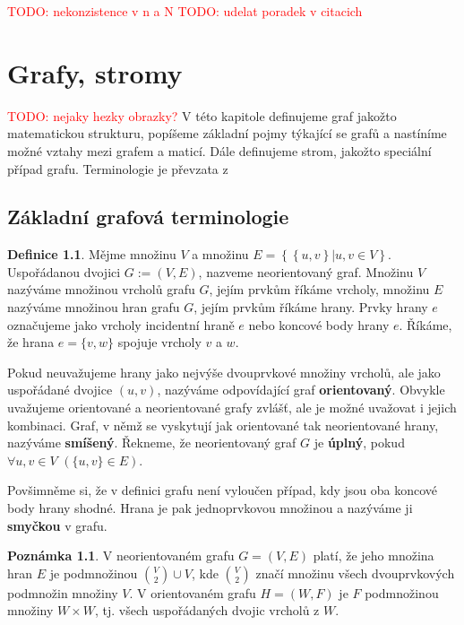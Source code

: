 \documentclass[11pt,american,czech,oneside]{book}
\theoremstyle{plain}
\theoremstyle{definition}
\newtheorem{definition}{Definice}
\newtheorem{remark}{Poznámka}
\newcommand{\TODO}[1]{\textcolor{red}{TODO: #1}}
\begin{document}
\TODO{nekonzistence v n a N}
\TODO{udelat poradek v citacich}


\chapter{Grafy, stromy} \TODO{nejaky hezky obrazky?} 
V této kapitole definujeme graf jakožto matematickou strukturu, popíšeme základní pojmy týkající se grafů a nastíníme možné vztahy mezi grafem a maticí. Dále definujeme strom, jakožto speciální případ grafu. Terminologie je převzata z \cite{koub:11}

\section{Základní grafová terminologie}

\begin{definition}
  Mějme množinu $V$ a množinu $E = \left\{ \left\{ u,v \right\} | u,v \in V \right\}$. Uspořádanou dvojici $G := (V,E)$, nazveme neorientovaný graf. Množinu $V$ nazýváme množinou vrcholů grafu $G$, jejím prvkům říkáme vrcholy, množinu $E$ nazýváme množinou hran grafu $G$, jejím prvkům říkáme hrany. Prvky hrany $e$ označujeme jako vrcholy incidentní hraně $e$ nebo koncové body hrany $e$. Říkáme, že hrana $e = \{v,w\}$ spojuje vrcholy $v$ a $w$.
\end{definition}

Pokud neuvažujeme hrany jako nejvýše dvouprvkové množiny vrcholů, ale  jako uspořádané dvojice $(u,v)$, nazýváme odpovídající graf \textbf{orientovaný}. Obvykle uvažujeme orientované a neorientované grafy zvlášť, ale je možné uvažovat i jejich kombinaci. Graf, v němž se vyskytují jak orientované tak neorientované hrany, nazýváme \textbf{smíšený}. Řekneme, že neorientovaný graf $G$ je \textbf{úplný}, pokud $\forall u, v \in V$ $\left(\{u,v\} \in E\right)$.

Povšimněme si, že v definici grafu není vyloučen případ, kdy jsou oba koncové body hrany shodné. Hrana je pak jednoprvkovou množinou a nazýváme ji \textbf{smyčkou} v grafu.

\begin{remark}
  V neorientovaném grafu $G=(V,E)$ platí, že jeho množina hran $E$ je podmnožinou ${V \choose 2} \cup V$, kde $V \choose 2$ značí množinu všech dvouprvkových podmnožin množiny $V$. V orientovaném grafu $H=(W,F)$ je $F$ podmnožinou množiny $W \times W$, tj. všech uspořádaných dvojic vrcholů z $W$.
\end{remark}
\end{document}
